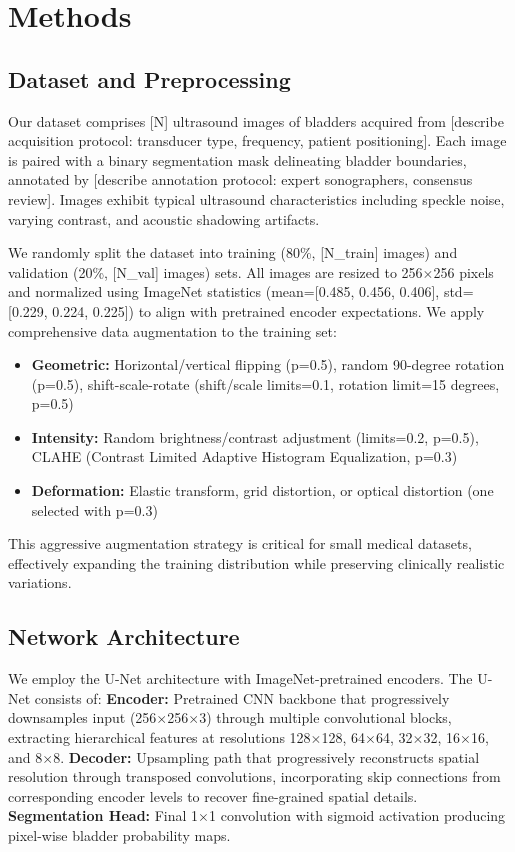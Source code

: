 \documentclass{article}
\begin{document}
\section{Methods}

\subsection{Dataset and Preprocessing}

Our dataset comprises [N] ultrasound images of bladders acquired from [describe acquisition protocol: transducer type, frequency, patient positioning]. Each image is paired with a binary segmentation mask delineating bladder boundaries, annotated by [describe annotation protocol: expert sonographers, consensus review]. Images exhibit typical ultrasound characteristics including speckle noise, varying contrast, and acoustic shadowing artifacts.

We randomly split the dataset into training (80\%, [N\_train] images) and validation (20\%, [N\_val] images) sets. All images are resized to 256$\times$256 pixels and normalized using ImageNet statistics (mean=[0.485, 0.456, 0.406], std=[0.229, 0.224, 0.225]) to align with pretrained encoder expectations. We apply comprehensive data augmentation to the training set:

\begin{itemize}
    \item \textbf{Geometric:} Horizontal/vertical flipping (p=0.5), random 90-degree rotation (p=0.5), shift-scale-rotate (shift/scale limits=0.1, rotation limit=15 degrees, p=0.5)
    \item \textbf{Intensity:} Random brightness/contrast adjustment (limits=0.2, p=0.5), CLAHE (Contrast Limited Adaptive Histogram Equalization, p=0.3)
    \item \textbf{Deformation:} Elastic transform, grid distortion, or optical distortion (one selected with p=0.3)
\end{itemize}

This aggressive augmentation strategy is critical for small medical datasets, effectively expanding the training distribution while preserving clinically realistic variations.

\subsection{Network Architecture}

We employ the U-Net architecture \cite{ref7} with ImageNet-pretrained encoders. The U-Net consists of: \textbf{Encoder:} Pretrained CNN backbone that progressively downsamples input (256$\times$256$\times$3) through multiple convolutional blocks, extracting hierarchical features at resolutions 128$\times$128, 64$\times$64, 32$\times$32, 16$\times$16, and 8$\times$8. \textbf{Decoder:} Upsampling path that progressively reconstructs spatial resolution through transposed convolutions, incorporating skip connections from corresponding encoder levels to recover fine-grained spatial details. \textbf{Segmentation Head:} Final 1$\times$1 convolution with sigmoid activation producing pixel-wise bladder probability maps.
\end{document}
